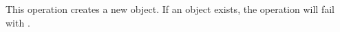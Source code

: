 \item This operation creates a new object.  If an object exists, the operation
    will fail with .
